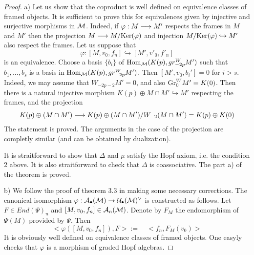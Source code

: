 \documentclass[10pt]{article}
\begin{document}
\begin{proof} a) Let us show that the coproduct is well defined on equivalence 
classes of framed objects. It is sufficient to prove this for equivalences given by 
injective and surjective morphisms in ${\cal M}$. Indeed, if 
$\varphi: M \longrightarrow M'$ respects the frames in $M$ and $M'$ then the projection 
$M \longrightarrow M/{\rm Ker} (\varphi)$ and injection $M/{\rm Ker} (\varphi) \hookrightarrow  M'$ 
also respect the frames. Let us suppose that 
$$
\varphi : [M, v_0, f_n] \hookrightarrow [M', v'_0, f'_n]
$$
is an equivalence. Choose a basis $\{b_i\}$ of 
${\rm Hom}_{\cal M} (K(p),gr_{-2p}^W  M')$ 
such that $b_1, ..., b_s$ is a basis in 
${\rm Hom}_{\cal M} (K(p),gr_{-2p}^W  M')$. Then 
$[M', v_0, b_{i}']=0$ for $i>s$. Indeed, we may assume that 
$W_{-2p-2}M'=0$, and also ${\rm Gr}^W_0M'= K(0)$. 
Then there is a natural injective morphism 
$K(p) \oplus M \cap M' \hookrightarrow M'$ respecting the frames, and the projection 
$$
K(p) \oplus (M\cap M') \longrightarrow K(p) \oplus (M\cap M')/W_{-2}(M\cap M') = 
K(p) \oplus K(0)
$$ The statement is proved. 
The arguments in the case of the projection are completly similar 
(and can be obtained by dualization). 


It is straitforward to show 
that $\Delta$ and $\mu$ satisfy the Hopf axiom, i.e. the condition 2 above. 
It is also straitforward to check that $\Delta$ is coassociative. 
The part a) of the theorem is proved. 


b)  We follow the proof of theorem 3.3 in \cite{G9} making some necessary 
corrections. The canonical isomorphism $\varphi: {\cal  A}_{\bullet}({\cal M}) \to 
{\cal U}_{\bullet}({\cal M})^{\vee}$
is constructed as follows.
Let $F \in End(\Psi)_n$ and $ [M,v_{0}, f_n]\in {\cal  A}_{n}({\cal M})$. 
Denote by $F_M$ the endomorphism of $\Psi(M)$ provided by $\Psi$. Then 
$$
<\varphi([M,v_{0}, f_n]) , F>:= \quad <f_n, F_M(v_{0})>
$$
It is obviously well defined on equivalence classes of framed objects. 
One easyly checks that $\varphi$ is a morphism of graded Hopf algebras. 


\end{proof}
\end{document}
